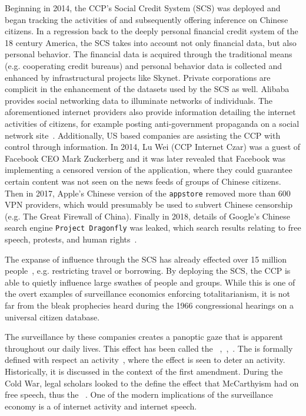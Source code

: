 Beginning in 2014, the CCP's Social Credit System (SCS) was deployed and began
tracking the activities of and subsequently offering inference on Chinese
citizens. In a regression back to the deeply personal financial credit system
of the 18 century America, the SCS takes into account not only financial
data, but also personal behavior. The financial data is acquired through the
traditional means (e.g. cooperating credit bureaus) and personal behavior data
is collected and enhanced by infrastructural projects like Skynet. Private
corporations are complicit in the enhancement of the datasets used by the SCS
as well. Alibaba provides social networking data to illuminate networks of
individuals. The aforementioned internet providers also provide information
detailing the internet activities of citizens, for example posting
anti-government propaganda on a social network site~\cite{qiang2019road}.
Additionally, US based companies are assisting the CCP with control through
information. In 2014, Lu Wei (CCP Internet Czar) was a guest of Facebook CEO
Mark Zuckerberg and it was later revealed that Facebook was implementing a
censored version of the application, where they could guarantee certain content
was not seen on the news feeds of groups of Chinese citizens. Then in 2017,
Apple's Chinese version of the \texttt{appstore} removed more than 600 VPN
providers, which would presumably be used to subvert Chinese censorship (e.g.
The Great Firewall of China). Finally in 2018, details of Google's Chinese
search engine \texttt{Project Dragonfly} was leaked, which search results
relating to free speech, protests, and human rights~\cite{qiang2019road}.

The expanse of influence through the SCS has already effected over 15 million
people~\cite{qiang2019road}, e.g. restricting travel or borrowing. By deploying the SCS, the CCP is able to quietly
influence large swathes of people and groups. While this is one of the overt
examples of surveillance economics enforcing totalitarianism, it is not far
from the bleak prophecies heard during the 1966 congressional hearings on a
universal citizen database.

The surveillance by these companies creates a panoptic gaze that is apparent
throughout our daily lives. This effect has been called the \ce
~\cite{schauer1978fear},~\cite{richards2012dangers},~\cite{penney2016chilling}. The \ce is formally
defined with respect an activity~\cite{schauer1978fear}, where the effect is
seen to deter an activity. Historically, it is discussed in the context of the
first amendment. During the Cold War, legal scholars looked to the define the
effect that McCarthyism had on free speech, thus the ~\ce. One of the modern
implications of the surveillance economy is a \ce of internet activity and
internet speech.

